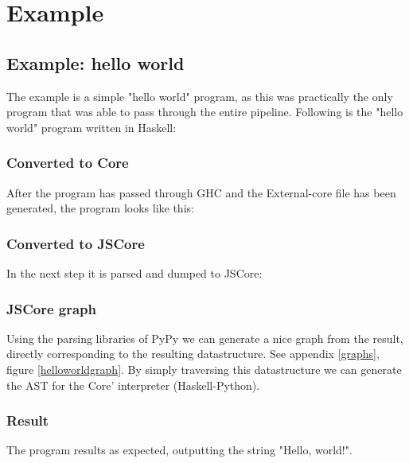 
\section{Example}


\subsection{Example: hello world}

The example is a simple "hello world" program, as this was practically
the only program that was able to pass through the entire pipeline. Following
is the "hello world" program written in Haskell:



\subsubsection{Converted to Core}

After the program has passed through GHC and the External-core file
has been generated, the program looks like this:



\subsubsection{Converted to JSCore}

In the next step it is parsed and dumped to JSCore:



\subsubsection{JSCore graph}

Using the parsing libraries of PyPy we can generate a nice graph from the result,
directly corresponding to the resulting datastructure. 
See appendix \ref{graphs}, figure \ref{helloworldgraph}.
By simply traversing this datastructure we can generate the AST for the Core' 
interpreter (Haskell-Python).

\subsubsection{Result}

The program results as expected, outputting the string "Hello, world!".









